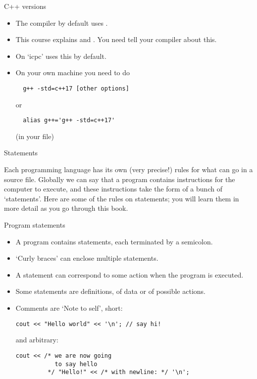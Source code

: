 \begin{slide}{C++ versions}
  \label{sl:cpp-version}
  \begin{itemize}
  \item
    The compiler by default uses . 
  \item This course explains  and .
    You need tell your compiler about this.
  \item On  `icpc' uses this by default.
  \item On your own machine you need to do
\begin{verbatim}
  g++ -std=c++17 [other options]
\end{verbatim}
or
\begin{verbatim}
  alias g++='g++ -std=c++17'
\end{verbatim}
(in your  file)
  \end{itemize}
\end{slide}

 {Statements}
\label{sec:statements}

Each programming language has its own (very precise!) rules for what
can go in a source file. Globally we can say that a program contains
instructions for the computer to execute, and these instructions take
the form of a bunch of `statements'. Here are some of the rules on
statements; you will learn them in more detail as you go through this
book.

\begin{block}{Program statements}
  \label{sl:cstatement}
  \begin{itemize}
  \item
    A program contains statements, each terminated by a semicolon.
  \item `Curly braces' can enclose multiple statements.
  \item A statement can correspond to some action when the program is
    executed.
  \item Some statements are definitions, of data or of possible actions.
  \item Comments are `Note to self', short:
\begin{lstlisting}
cout << "Hello world" << '\n'; // say hi!
\end{lstlisting}
and arbitrary:
\begin{lstlisting}
cout << /* we are now going
           to say hello
         */ "Hello!" << /* with newline: */ '\n';
\end{lstlisting}
  \end{itemize}
\end{block}

